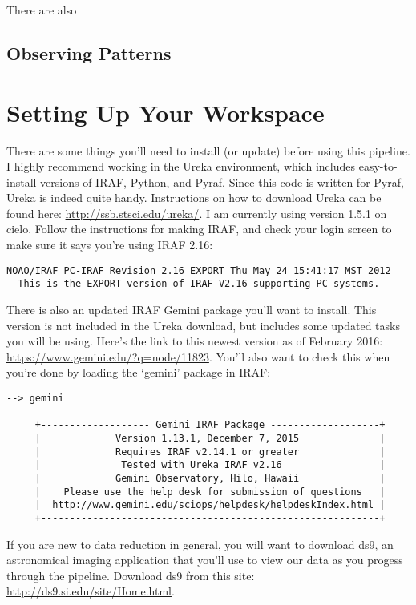 \documentclass[12pt]{report}
\begin{document}
There are also

\section{Observing Patterns}

\chapter{Setting Up Your Workspace}

There are some things you'll need to install (or update) before using this pipeline. I highly recommend working in the Ureka environment, which includes easy-to-install versions of IRAF, Python, and Pyraf. Since this code is written for Pyraf, Ureka is indeed quite handy. Instructions on how to download Ureka can be found here: \url{http://ssb.stsci.edu/ureka/}. I am currently using version 1.5.1 on cielo. Follow the instructions for making IRAF, and check your login screen to make sure it says you're using IRAF 2.16:

\begin{verbatim}
NOAO/IRAF PC-IRAF Revision 2.16 EXPORT Thu May 24 15:41:17 MST 2012
  This is the EXPORT version of IRAF V2.16 supporting PC systems.
\end{verbatim}

There is also an updated IRAF Gemini package you'll want to install. This version is not included in the Ureka download, but includes some updated tasks you will be using. Here's the link to this newest version as of February 2016: \url{https://www.gemini.edu/?q=node/11823}. You'll also want to check this when you're done by loading the `gemini' package in IRAF:

\begin{verbatim}
--> gemini

     +------------------- Gemini IRAF Package -------------------+
     |             Version 1.13.1, December 7, 2015              |
     |             Requires IRAF v2.14.1 or greater              |
     |              Tested with Ureka IRAF v2.16                 |
     |             Gemini Observatory, Hilo, Hawaii              |
     |    Please use the help desk for submission of questions   |
     |  http://www.gemini.edu/sciops/helpdesk/helpdeskIndex.html |
     +-----------------------------------------------------------+
\end{verbatim}


If you are new to data reduction in general, you will want to download ds9, an astronomical imaging application that you'll use to view our data as you progess through the pipeline. Download ds9 from this site: \url{http://ds9.si.edu/site/Home.html}.
\end{document}
